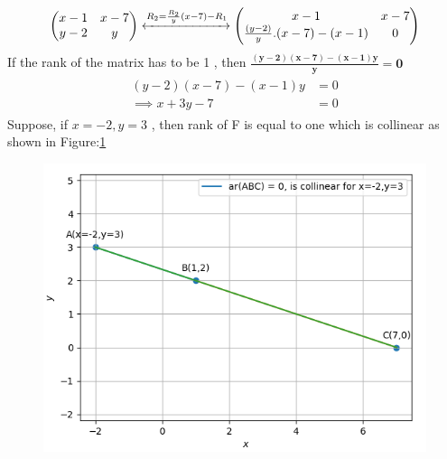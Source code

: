 \documentclass[12pt]{article}
\newcommand{\myvec}[1]{\ensuremath{\begin{pmatrix}#1\end{pmatrix}}}
\let\vec\mathbf
\begin{document}
\begin{align}
\label{eq:chem_balance_mat_row}
\myvec{
x-1 & x-7
\\
y-2 & y
}
	\xleftrightarrow[]{R_2 = \frac{R_2}{y}(x-7)-R_1}
\myvec{
x-1 & x-7
\\
	\frac{(y-2)}{y}.(x-7)-(x-1) & 0
}
\end{align}
If the rank of the matrix has to be 1 , then $\vec{\frac{(y-2)(x-7)-(x-1)y}{y}=0}$
\begin{align}
\begin{split}
	(y-2)(x-7)-(x-1)y &=0
\\
\implies x+3y-7 &=0 
\end{split}
\end{align}
Suppose, if $x=-2,y=3$ , then rank of F is equal to one which is collinear as shown in Figure:\ref    {fig:Fig}
\begin{figure}[!h]
	\begin{center} 
	    \includegraphics[width=\columnwidth]{./figs/sc1.png}
	\end{center}
\caption{}
\label{fig:Fig}
\end{figure}
\end{document}

